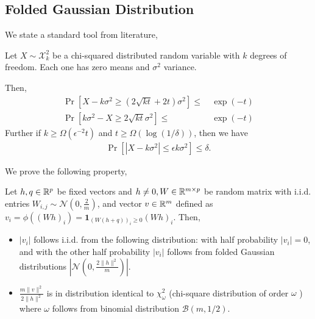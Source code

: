 \subsection{Folded Gaussian Distribution}\label{sec:folded_dist}

We state a standard tool from literature,
\begin{lemma}\label{lem:lm}
    Let $X \sim \mathcal{X}_k^2$ be a chi-squared distributed random variable with $k$ degrees of freedom. Each one has zero means and $\sigma^2$ variance. 
    
    Then,
    \begin{align*}
        \Pr[X - k\sigma^2 \geq (2\sqrt{kt} + 2t) \sigma^2]
        \leq & ~ \exp{(-t)}\\
        \Pr[k\sigma^2 - X \geq 2\sqrt{kt}\sigma^2]
        \leq & ~ \exp{(-t)}
    \end{align*}
    Further if $k \geq \Omega(\epsilon^{-2} t)$ and $t \geq \Omega(\log(1/\delta))$, then we have
    \begin{align*}
    \Pr[ | X - k \sigma^2 | \leq \epsilon k \sigma^2 ] \leq \delta.
    \end{align*}
\end{lemma}

We prove the following property,
\begin{fact}\label{fac:key_property_ReLU}
Let $h, q \in \mathbb{R}^p$ be fixed vectors and $h \neq 0, W \in \mathbb{R}^{m \times p}$ be random matrix with i.i.d. entries $W_{i, j} \sim \mathcal{N} (0, \frac{2}{m} )$, and vector $v \in \mathbb{R}^m$ defined as $v_i=\phi ((W h)_i )=\mathbf{1}_{(W(h+q))_i \geq 0}(W h)_i$. Then,
\begin{itemize}
    \item $ |v_i |$ follows i.i.d. from the following distribution: with half probability $ |v_i |=0$, and with the other half probability $ |v_i |$ follows from folded Gaussian distributions $ |\mathcal{N} (0, \frac{2\|h\|^2}{m} ) |$.
    \item $\frac{m\|v\|^2}{2\|h\|^2}$ is in distribution identical to $\chi_\omega^2$ (chi-square distribution of order $\omega$ ) where $\omega$ follows from binomial distribution $\mathcal{B}(m, 1 / 2)$.
\end{itemize}

\end{fact}

